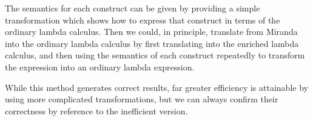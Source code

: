 

The semantics for each construct can be given by providing a simple transformation which shows how to express that construct in terms of the ordinary lambda calculus. Then we could, in principle, translate from Miranda into the ordinary lambda calculus by first translating into the enriched lambda calculus, and then using the semantics of each construct repeatedly to transform the expression into an ordinary lambda expression.


While this method generates correct results, far greater efficiency is attainable by using more complicated transformations, but we can always confirm their correctness by reference to the inefficient version.

